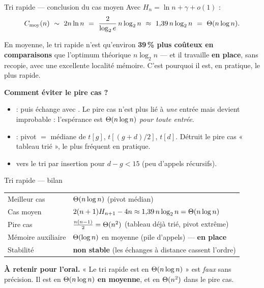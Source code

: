 \documentclass[11pt,aspectratio=169]{beamer}
\begin{document}
\begin{frame}{Tri rapide --- conclusion du cas moyen}
Avec $H_n=\ln n+\gamma+o(1)$ :
\[
C_{\text{moy}}(n)\ \sim\ 2n\ln n\ =\ \frac{2}{\log_2 e}\,n\log_2 n\ \approx\ 1{,}39\,n\log_2 n
\ =\ \Th(n\log n).
\]
\begin{encadre}\small
En moyenne, le tri rapide n'est qu'environ \textbf{39\,\% plus coûteux en comparaisons}
que l'optimum théorique $n\log_2 n$ --- et il travaille \textbf{en place}, sans recopie,
avec une excellente localité mémoire. C'est pourquoi il est, en pratique, le plus rapide.
\end{encadre}
\pause
\vspace{4pt}
\textbf{Comment éviter le pire cas ?}
\begin{itemize}\small\setlength\itemsep{1pt}
  \item {} :  puis échange avec .
        Le pire cas n'est plus lié à \emph{une} entrée mais devient improbable : l'espérance
        est $\Theta(n\log n)$ \emph{pour toute entrée}.
  \item {} : pivot $=$ médiane de $t[g]$, $t[(g+d)/2]$, $t[d]$.
        Détruit le pire cas « tableau trié », le plus fréquent en pratique.
  \item {} vers le tri par insertion pour $d-g<15$ (peu d'appels récursifs).
\end{itemize}
\end{frame}

\begin{frame}{Tri rapide --- bilan}
\begin{center}\small
\begin{tabular}{ll}
\toprule
Meilleur cas & $\Theta(n\log n)$ (pivot médian)\\
Cas moyen & $2(n+1)H_{n+1}-4n\approx 1{,}39\,n\log_2 n=\Theta(n\log n)$\\
Pire cas & $\frac{n(n-1)}2=\Theta(n^2)$ (tableau déjà trié, pivot extrême)\\
Mémoire auxiliaire & $\Theta(\log n)$ en moyenne (pile d'appels) --- \textbf{en place}\\
Stabilité & \textbf{non stable} (les échanges à distance cassent l'ordre)\\
\bottomrule
\end{tabular}
\end{center}
\vspace{6pt}
\begin{attention}\small
\textbf{À retenir pour l'oral.} « Le tri rapide est en $\Theta(n\log n)$ » est \emph{faux}
sans précision. Il est en $\Theta(n\log n)$ \textbf{en moyenne}, et en $\Theta(n^2)$
dans le pire cas.
\end{attention}
\end{frame}
\end{document}
